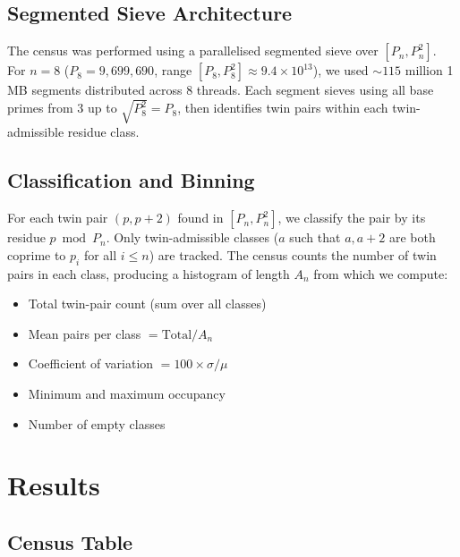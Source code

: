 \documentclass[11pt]{article}
\begin{document}
\subsection{Segmented Sieve Architecture}

The census was performed using a parallelised segmented sieve over $[P_n, P_n^2]$. For $n=8$ ($P_8 = 9{,}699{,}690$, range $[P_8, P_8^2] \approx 9.4 \times 10^{13}$), we used $\sim 115$ million 1 MB segments distributed across 8 threads. Each segment sieves using all base primes from 3 up to $\sqrt{P_8^2} = P_8$, then identifies twin pairs within each twin-admissible residue class.

\subsection{Classification and Binning}

For each twin pair $(p, p+2)$ found in $[P_n, P_n^2]$, we classify the pair by its residue $p \bmod P_n$. Only twin-admissible classes ($a$ such that $a, a+2$ are both coprime to $p_i$ for all $i \leq n$) are tracked. The census counts the number of twin pairs in each class, producing a histogram of length $A_n$ from which we compute:
\begin{itemize}
  \item Total twin-pair count (sum over all classes)
  \item Mean pairs per class $= \text{Total} / A_n$
  \item Coefficient of variation $= 100 \times \sigma / \mu$
  \item Minimum and maximum occupancy
  \item Number of empty classes
\end{itemize}

\section{Results}
\label{sec:results}

\subsection{Census Table}
\end{document}
